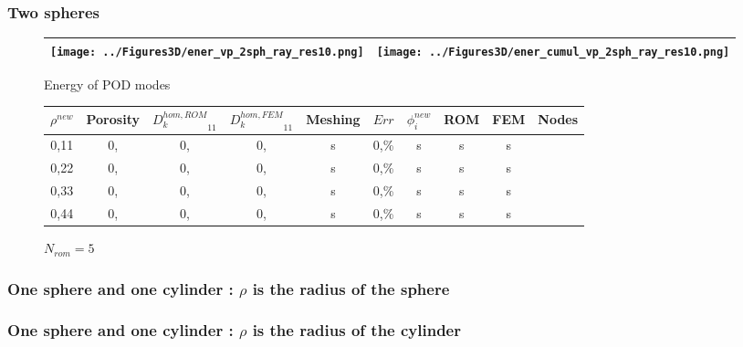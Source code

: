 \subsubsection{Two spheres}


\begin{figure}[H]
\begin{center}
\begin{tabular}{|c|c|}
\hline
\texttt{[image: ../Figures3D/ener\_vp\_2sph\_ray\_res10.png]}
&%
\texttt{[image: ../Figures3D/ener\_cumul\_vp\_2sph\_ray\_res10.png]}
\\ \hline
\end{tabular}
\end{center}
\caption{Energy of POD modes}
\end{figure}

\begin{figure}[H]%
%
\begin{center}
\begin{tabular}{|c|c||c|c||c|c||c|c||c||c|}
\hline
$\rho^{new}$&Porosity&${D_k^{hom,ROM}}_{11}$&${D_k^{hom,FEM}}_{11}$&Meshing&$Err$&$\phi_i^{new}$&ROM&FEM&Nodes\\
\hline
0,11&0,&0,&0,&s&0,\%&s&s&s&\\
\hline
0,22&0,&0,&0,&s&0,\%&s&s&s&\\
\hline
0,33&0,&0,&0,&s&0,\%&s&s&s&\\
\hline
0,44&0,&0,&0,&s&0,\%&s&s&s&\\
\hline
\end{tabular}
\end{center}
\caption{$N_{rom}=5$}
%
\end{figure}

\subsubsection{One sphere and one cylinder : $\rho$ is the radius of the sphere}

\subsubsection{One sphere and one cylinder : $\rho$ is the radius of the cylinder}




